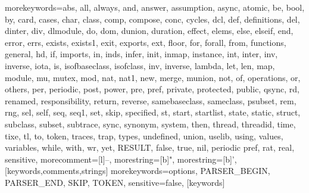   {morekeywords={abs, all,
     always, and, answer, assumption, async, atomic, be, bool, by, card, cases,
     char, class, comp, compose, conc, cycles, dcl, def, definitions,
     del, dinter, div, dlmodule, do,
     dom, dunion, duration, effect, elems, else, elseif, end, error, errs, exists,
     exists1, exit, exports, ext, floor, for, forall, from, functions,
     general, hd, if, imports, in,
     inds, infer, init, inmap, instance, int, inter, inv, inverse, iota, is,
     isofbaseclass, isofclass, inv, inverse, lambda, let, len, map,
     module, mu, mutex, mod,
     nat, nat1, new, merge, munion, not, of, operations, or, others, per, periodic,
     post, power, pre, pref, private, protected, public, qsync, rd,
     renamed, responsibility,
     return, reverse, samebaseclass, sameclass, psubset, rem, rng, sel, self, seq,
     seq1, set, skip, specified, st, start, startlist, state, static, struct,
     subclass, subset,
     subtrace, sync, synonym, system, then, thread, threadid, time, tixe, tl, to,
     token, traces, trap, types, undefined, union, uselib, using, values, variables, while,
     with, wr, yet, RESULT, false, true, nil, periodic pref, rat, real},
   sensitive,
   morecomment=[l]--,
   morestring=[b]",
   morestring=[b]',
  }[keywords,comments,strings]
  {morekeywords={options, PARSER\_BEGIN, PARSER\_END, SKIP, TOKEN},
   sensitive=false,
  }[keywords]
